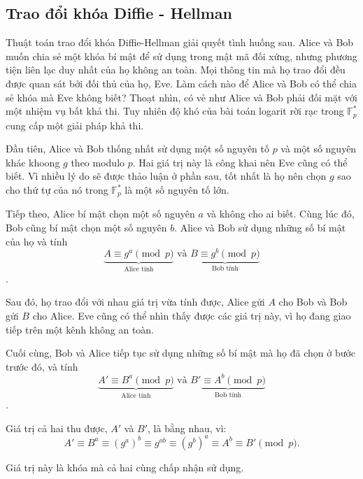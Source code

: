 \subsection{Trao đổi khóa Diffie - Hellman}

Thuật toán trao đổi khóa Diffie-Hellman giải quyết tình huống sau. Alice và
Bob muốn chia sẻ một khóa bí mật để sử dụng trong mật mã đối xứng, nhưng
phương tiện liên lạc duy nhất của họ không an toàn. Mọi thông tin mà họ trao
đổi đều được quan sát bởi đối thủ của họ, Eve. Làm cách nào để Alice và Bob có
thể chia sẻ khóa mà Eve không biết? Thoạt nhìn, có vẻ như Alice và Bob phải
đối mặt với một nhiệm vụ bất khả thi. Tuy nhiên độ khó của bài toán logarit rời
rạc trong $\mathbb{F}^*_p$ cung cấp một giải pháp khả thi.

Đầu tiên, Alice và Bob thống nhất sử dụng một số nguyên tố $p$ và một số nguyên khác khoong $g$ theo modulo $p$. Hai giá trị này là công khai nên Eve cũng có thể biết.
Vì nhiều lý do sẽ được thảo luận ở phần sau, tốt nhất là họ nên chọn $g$ sao cho thứ tự của nó trong $\mathbb{F}^*_p$ là một số nguyên tố lớn.

Tiếp theo, Alice bí mật chọn một số nguyên $a$ và không cho ai biết. Cùng lúc đó, Bob cũng bí mật chọn một số nguyên $b$.
Alice và Bob sử dụng những số bí mật của họ và tính
$$\underbrace{A \equiv g^a \pmod{p}}_{\text{Alice tính}} \text{ và } \underbrace{B \equiv g^b \pmod{p}}_{\text{Bob tính}}$$.

Sau đó, họ trao đổi với nhau giá trị vừa tính được, Alice gửi $A$ cho Bob và Bob gửi $B$ cho Alice. Eve cũng có thể nhìn thấy được các giá trị này, vì họ đang giao tiếp trên một kênh không an toàn.

Cuối cùng, Bob và Alice tiếp tục sử dụng những số bí mật mà họ đã chọn ở bước trước đó, và tính
$$\underbrace{A' \equiv B^a \pmod{p}}_{\text{Alice tính}} \text{ và } \underbrace{B' \equiv A^b \pmod{p}}_{\text{Bob tính}}$$.

Giá trị cả hai thu được, $A'$ và $B'$, là bằng nhau, vì:
$$A' \equiv B^a \equiv (g^a)^b \equiv g^{ab} \equiv (g^b)^a \equiv A^b \equiv B' \pmod{p}.$$

Giá trị này là khóa mà cả hai cùng chấp nhận sử dụng.

